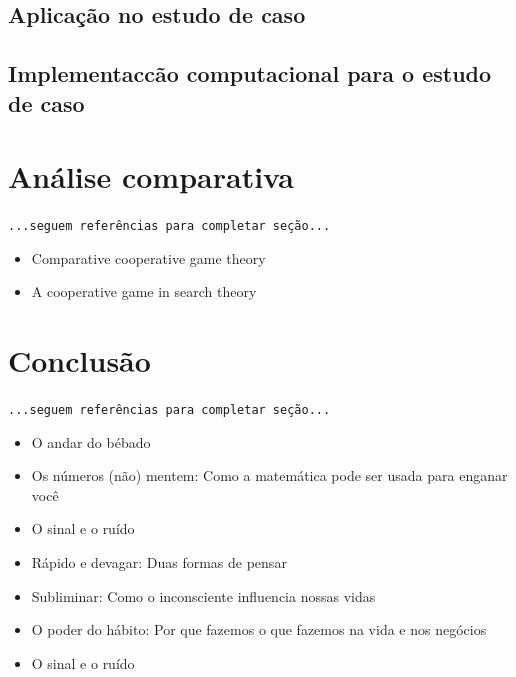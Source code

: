 \documentclass[
	article,			        %
	11pt,				          %
	oneside,			        %
	a4paper,			        %
	english,			        %
	brazil,				        %
	sumario=tradicional
]{abntex2}\usepackage[]{graphicx}\usepackage[]{color}
\begin{document}
\subsection{Aplicação no estudo de caso}

\subsection{Implementac{c}ão computacional para o estudo de caso}


\section{Análise comparativa}

  \texttt{\color{red}...seguem referências para completar seção...}
  \begin{itemize}
    \item Comparative cooperative game theory \cite{Ichiishi.1990}
    \item A cooperative game in search theory \cite{Hohzaki.2009}
  \end{itemize}

% 

\section{Conclusão}

  \texttt{\color{red}...seguem referências para completar seção...}
  \begin{itemize}
    \item O andar do bébado \cite{Mlodinow.2009}
    \item Os n\'umeros (não) mentem: Como a matemática pode ser usada para enganar você \cite{Seife.2012}
    \item O sinal e o ruído \cite{Nate.2012}
    \item R{á}pido e devagar: Duas formas de pensar \cite{Kahneman.2012}
    \item Subliminar: Como o inconsciente influencia nossas vidas \cite{Mlodinow.2013}
    \item O poder do h{á}bito: Por que fazemos o que fazemos na vida e nos neg{ó}cios \cite{Duhigg.2012}
    \item O sinal e o ruído \cite{Nate.2012}
  \end{itemize}
\end{document}
